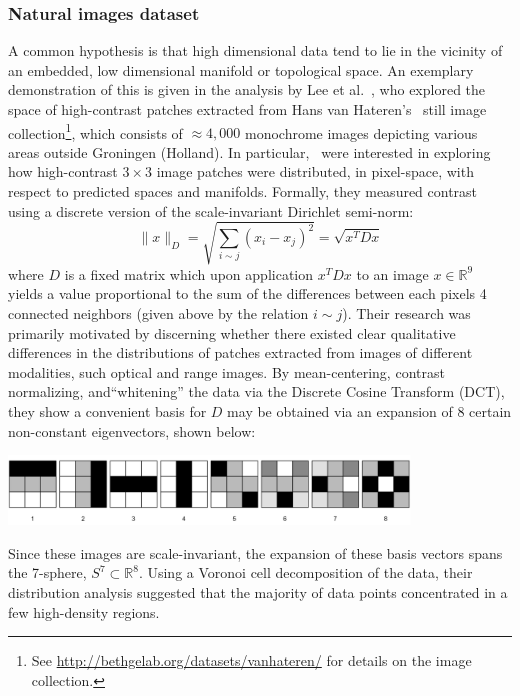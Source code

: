 \documentclass[sn-mathphys]{sn-jnl}
\begin{document}
 \subsubsection{Natural images dataset}\label{sec:natural_images}
A common hypothesis is that high dimensional data tend to lie in the vicinity of an embedded, low dimensional manifold or topological space. An exemplary demonstration of this is given in the analysis by Lee et al.~\cite{lee2003nonlinear}, who explored the space of high-contrast patches extracted from Hans van Hateren's~\cite{hateren_schaaf_1998} still image collection\footnote{See \url{http://bethgelab.org/datasets/vanhateren/} for details on the image collection.}, which consists of $\approx 4,000$ monochrome images depicting various areas outside Groningen (Holland). 
In particular,~\cite{lee2003nonlinear} were interested in exploring how high-contrast $3 \times 3$ image patches  were distributed, in pixel-space, with respect to predicted spaces and manifolds.
Formally, they measured contrast using a discrete version of the scale-invariant Dirichlet semi-norm:
$$ \lVert x \rVert_D = \sqrt{\sum_{i \sim j}(x_i - x_j)^2} = \sqrt{x^T D x}$$
where $D$ is a fixed matrix which upon application $x^T D x$ to an image $x \in \mathbb{R}^9$ yields a value proportional to the sum of the differences between each pixels 4 connected neighbors (given above by the relation $i \sim j$).
Their research was primarily motivated by discerning whether there existed clear qualitative differences in the distributions of patches extracted from images of different modalities, such optical and range images.
By mean-centering, contrast normalizing, and``whitening'' the data via the Discrete Cosine Transform (DCT), they show a convenient basis for $D$ may be obtained via an expansion of 8 certain non-constant eigenvectors, shown below: 
\begin{center}
	\includegraphics[width=0.80\textwidth]{dct_basis} 
\end{center}
Since these images are scale-invariant, the expansion of these basis vectors spans the 7-sphere, $S^7 \subset \mathbb{R}^8$. Using a Voronoi cell decomposition of the data, their distribution analysis suggested that the majority of data points concentrated in a few high-density regions. 
\end{document}

